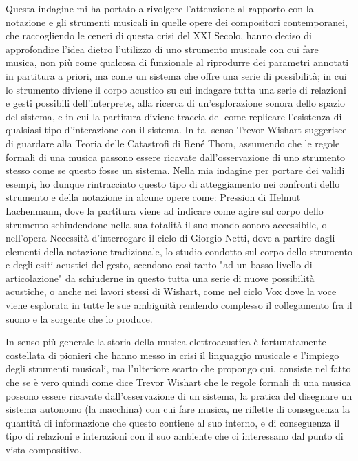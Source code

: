 Questa indagine mi ha portato a rivolgere l'attenzione al rapporto con la notazione 
e gli strumenti musicali in quelle opere dei compositori contemporanei, 
che raccogliendo le ceneri di questa crisi del XXI Secolo, 
hanno deciso di approfondire l'idea dietro l'utilizzo
di uno strumento musicale con cui fare musica, non più come 
qualcosa di funzionale al riprodurre dei parametri annotati in partitura a priori,
ma come un sistema che offre una serie di possibilità; 
in cui lo strumento diviene il corpo acustico su cui indagare 
tutta una serie di relazioni e gesti possibili dell'interprete, 
alla ricerca di un'esplorazione sonora dello spazio del sistema,
e in cui la partitura diviene traccia del come replicare l'esistenza di 
qualsiasi tipo d'interazione con il sistema.
In tal senso Trevor Wishart suggerisce di guardare alla Teoria delle Catastrofi 
di René Thom, assumendo che le regole formali di una musica passono
essere ricavate dall'osservazione di uno strumento stesso come se questo fosse un sistema.
Nella mia indagine per portare dei validi esempi, ho dunque rintracciato questo tipo di atteggiamento 
nei confronti dello strumento
e della notazione in alcune opere come: Pression di Helmut Lachenmann,
dove la partitura viene ad indicare come agire sul corpo dello strumento
schiudendone nella sua totalità il suo mondo sonoro accessibile,
o nell'opera Necessità d'interrogare il cielo di Giorgio Netti,
dove a partire dagli elementi della notazione tradizionale, lo studio condotto 
sul corpo dello strumento e degli esiti acustici del gesto, scendono così tanto 
"ad un basso livello di articolazione" da schiuderne in questo tutta una serie di nuove possibilità
acustiche, o anche nei lavori stessi di Wishart, come nel ciclo Vox 
dove la voce viene esplorata in tutte le sue ambiguità rendendo
complesso il collegamento fra il suono e la sorgente che lo produce. 

In senso più generale la storia della musica elettroacustica è fortunatamente costellata 
di pionieri che hanno messo in crisi il linguaggio musicale e l'impiego degli strumenti musicali,
ma l'ulteriore scarto che propongo qui, consiste nel fatto che se è vero quindi come 
dice Trevor Wishart che le regole formali di una musica possono
essere ricavate dall'osservazione di un sistema, 
la pratica del disegnare un sistema autonomo (la macchina) con cui fare musica,
ne riflette di conseguenza la quantità di informazione che questo contiene al suo interno,
e di conseguenza il tipo di relazioni e interazioni con il suo ambiente che 
ci interessano dal punto di vista compositivo.

